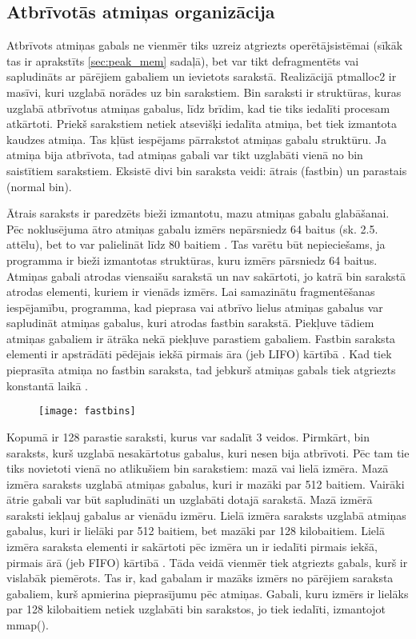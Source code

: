  \subsection{Atbrīvotās atmiņas organizācija}
 \label{subsec:bin_saraksti}
Atbrīvots atmiņas gabals ne vienmēr tiks uzreiz atgriezts operētājsistēmai (sīkāk tas ir aprakstīts \ref{sec:peak_mem} sadaļā), bet var tikt defragmentēts vai sapludināts ar pārējiem gabaliem un ievietots sarakstā. 
Realizācijā ptmalloc2 ir masīvi, kuri uzglabā norādes uz bin sarakstiem.
Bin saraksti ir struktūras, kuras uzglabā atbrīvotus atmiņas gabalus, līdz brīdim, kad tie tiks iedalīti procesam atkārtoti.
Priekš sarakstiem netiek atsevišķi iedalīta atmiņa, bet tiek izmantota kaudzes atmiņa.
Tas kļūst iespējams pārrakstot atmiņas gabalu struktūru.
Ja atmiņa bija atbrīvota, tad atmiņas gabali var tikt uzglabāti vienā no bin saistītiem sarakstiem.
Eksistē divi bin saraksta veidi: ātrais (fastbin) un parastais (normal bin).


Ātrais saraksts ir paredzēts bieži izmantotu, mazu atmiņas gabalu glabāšanai.
Pēc noklusējuma ātro atmiņas gabalu izmērs nepārsniedz 64 baitus (sk. 2.5. attēlu), bet to var palielināt līdz 80 baitiem \cite {MALLOC}. 
Tas varētu būt nepieciešams, ja programma ir bieži izmantotas struktūras, kuru izmērs pārsniedz 64 baitus.
Atmiņas gabali atrodas viensaišu sarakstā un nav sakārtoti, jo katrā bin sarakstā atrodas elementi, kuriem ir vienāds izmērs.
Lai samazinātu fragmentēšanas iespējamību, programma, kad pieprasa vai atbrīvo lielus atmiņas gabalus var sapludināt atmiņas gabalus, kuri atrodas fastbin sarakstā.
Piekļuve tādiem atmiņas gabaliem ir ātrāka nekā piekļuve parastiem gabaliem. 
Fastbin saraksta elementi ir apstrādāti pēdējais iekšā pirmais āra (jeb LIFO) kārtībā \cite {Binning}.
Kad tiek pieprasīta atmiņa no fastbin saraksta, tad jebkurš atmiņas gabals tiek atgriezts konstantā laikā  \cite {ACCA}.
\begin{figure}[h]
\begin{center}
\texttt{[image: fastbins]}
\end{center}
\caption{\textbf{\fontsize{11}{12}\selectfont {Ātrais saraksts}}}
\label{fig:fastbin}
\end{figure}

Kopumā ir 128 parastie saraksti, kurus var sadalīt 3 veidos. 
Pirmkārt, bin saraksts, kurš uzglabā nesakārtotus gabalus, kuri nesen bija atbrīvoti.  
Pēc tam tie tiks novietoti vienā no atlikušiem bin sarakstiem: mazā vai lielā izmēra. 
Mazā izmēra saraksts uzglabā atmiņas gabalus, kuri ir mazāki par 512 baitiem. 
Vairāki ātrie gabali var būt sapludināti un uzglabāti dotajā sarakstā. 
Mazā izmērā saraksti iekļauj gabalus ar vienādu izmēru. 
Lielā izmēra saraksts uzglabā atmiņas gabalus, kuri ir lielāki par 512 baitiem, bet mazāki par 128 kilobaitiem. 
Lielā izmēra saraksta elementi ir sakārtoti pēc izmēra un ir iedalīti pirmais iekšā, pirmais ārā (jeb FIFO) kārtībā \cite {Binning}. 
Tāda veidā vienmēr tiek atgriezts gabals, kurš ir vislabāk piemērots.
Tas ir, kad gabalam ir mazāks izmērs no pārējiem saraksta gabaliem, kurš apmierina pieprasījumu pēc atmiņas.
Gabali, kuru izmērs ir lielāks par 128 kilobaitiem netiek uzglabāti bin sarakstos, jo tiek iedalīti, izmantojot mmap(). 




